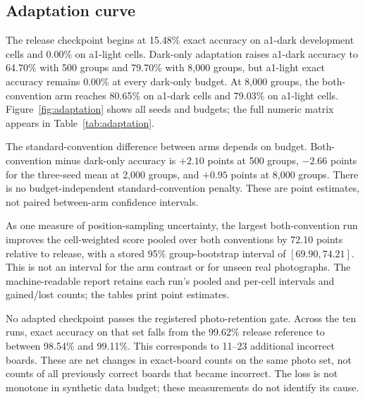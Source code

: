 \subsection{Adaptation curve}

The release checkpoint begins at 15.48\% exact accuracy on a1-dark development
cells and 0.00\% on a1-light cells. Dark-only adaptation raises a1-dark accuracy
to 64.70\% with 500 groups and 79.70\% with 8,000 groups, but a1-light exact
accuracy remains 0.00\% at every dark-only budget. At 8,000 groups, the
both-convention arm reaches 80.65\% on a1-dark cells and 79.03\% on a1-light
cells. Figure~\ref{fig:adaptation} shows all seeds and budgets; the full numeric
matrix appears in Table~\ref{tab:adaptation}.



The standard-convention difference between arms depends on budget. Both-convention
minus dark-only accuracy is $+2.10$ points at 500 groups, $-2.66$ points for the
three-seed mean at 2,000 groups, and $+0.95$ points at 8,000 groups. There is no
budget-independent standard-convention penalty. These are point estimates, not
paired between-arm confidence intervals.

As one measure of position-sampling uncertainty, the largest both-convention run
improves the cell-weighted score pooled over both conventions by 72.10 points
relative to release, with a stored 95\% group-bootstrap interval of
$[69.90,74.21]$. This is not an interval for the arm contrast or for unseen real
photographs. The machine-readable report retains each run's pooled and per-cell
intervals and gained/lost counts; the tables print point estimates.

No adapted checkpoint passes the registered photo-retention gate. Across the
ten runs, exact accuracy on that set falls from the 99.62\% release reference to
between 98.54\% and 99.11\%. This corresponds to 11--23 additional incorrect
boards. These are net changes in exact-board counts on the same photo set, not
counts of all previously correct boards that became incorrect. The loss is not
monotone in synthetic data budget; these measurements do not identify its cause.

